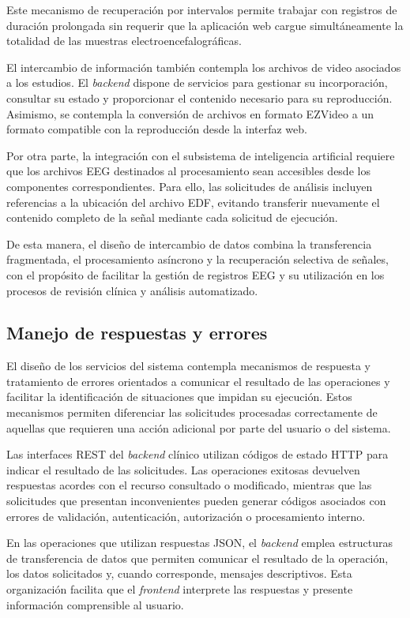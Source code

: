 Este mecanismo de recuperación por intervalos
permite trabajar con registros de duración
prolongada sin requerir que la aplicación
web cargue simultáneamente la totalidad
de las muestras electroencefalográficas.

El intercambio de información también
contempla los archivos de video asociados
a los estudios. El \textit{backend} dispone de
servicios para gestionar su incorporación,
consultar su estado y proporcionar el
contenido necesario para su reproducción.
Asimismo, se contempla la conversión de
archivos en formato EZVideo a un formato
compatible con la reproducción desde
la interfaz web.

Por otra parte, la integración con el
subsistema de inteligencia artificial
requiere que los archivos EEG destinados
al procesamiento sean accesibles desde
los componentes correspondientes. Para
ello, las solicitudes de análisis incluyen
referencias a la ubicación del archivo
EDF, evitando transferir nuevamente
el contenido completo de la señal
mediante cada solicitud de ejecución.

De esta manera, el diseño de intercambio
de datos combina la transferencia
fragmentada, el procesamiento asíncrono
y la recuperación selectiva de señales,
con el propósito de facilitar la
gestión de registros EEG y su
utilización en los procesos de revisión
clínica y análisis automatizado.


\subsection{Manejo de respuestas y errores}
\label{subsec:manejo-respuestas-errores}

El diseño de los servicios del sistema contempla
mecanismos de respuesta y tratamiento de errores
orientados a comunicar el resultado de las operaciones
y facilitar la identificación de situaciones que
impidan su ejecución. Estos mecanismos permiten
diferenciar las solicitudes procesadas correctamente
de aquellas que requieren una acción adicional
por parte del usuario o del sistema.

Las interfaces REST del \textit{backend} clínico utilizan
códigos de estado HTTP para indicar el resultado
de las solicitudes. Las operaciones exitosas
devuelven respuestas acordes con el recurso
consultado o modificado, mientras que las
solicitudes que presentan inconvenientes
pueden generar códigos asociados con errores
de validación, autenticación, autorización
o procesamiento interno.

En las operaciones que utilizan respuestas JSON,
el \textit{backend} emplea estructuras de transferencia
de datos que permiten comunicar el resultado
de la operación, los datos solicitados y,
cuando corresponde, mensajes descriptivos.
Esta organización facilita que el \textit{frontend}
interprete las respuestas y presente información
comprensible al usuario.

